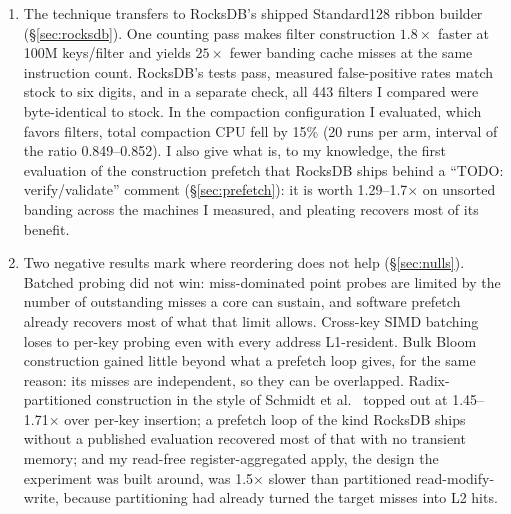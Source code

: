 \documentclass[a4paper,UKenglish,cleveref,autoref,thm-restate,anonymous]{lipics-v2021}
\begin{document}
\begin{enumerate}
\item The technique transfers to RocksDB's shipped Standard128 ribbon builder (\S\ref{sec:rocksdb}). One counting pass makes filter construction $1.8\times$ faster at 100M keys/filter and yields $25\times$ fewer banding cache misses at the same instruction count. RocksDB's tests pass, measured false-positive rates match stock to six digits, and in a separate check, all 443 filters I compared were byte-identical to stock. In the compaction configuration I evaluated, which favors filters, total compaction CPU fell by 15\% (20 runs per arm, interval of the ratio 0.849--0.852). I also give what is, to my knowledge, the first evaluation of the construction prefetch that RocksDB ships behind a ``TODO: verify/validate'' comment (\S\ref{sec:prefetch}): it is worth 1.29--1.7$\times$ on unsorted banding across the machines I measured, and pleating recovers most of its benefit.
\item Two negative results mark where reordering does not help (\S\ref{sec:nulls}). Batched probing did not win: miss-dominated point probes are limited by the number of outstanding misses a core can sustain, and software prefetch already recovers most of what that limit allows. Cross-key SIMD batching loses to per-key probing even with every address L1-resident. Bulk Bloom construction gained little beyond what a prefetch loop gives, for the same reason: its misses are independent, so they can be overlapped. Radix-partitioned construction in the style of Schmidt et al.~\cite{schmidt2021partitioned} topped out at 1.45--1.71$\times$ over per-key insertion; a prefetch loop of the kind RocksDB ships without a published evaluation recovered most of that with no transient memory; and my read-free register-aggregated apply, the design the experiment was built around, was 1.5$\times$ slower than partitioned read-modify-write, because partitioning had already turned the target misses into L2 hits.
\end{enumerate}
\end{document}
